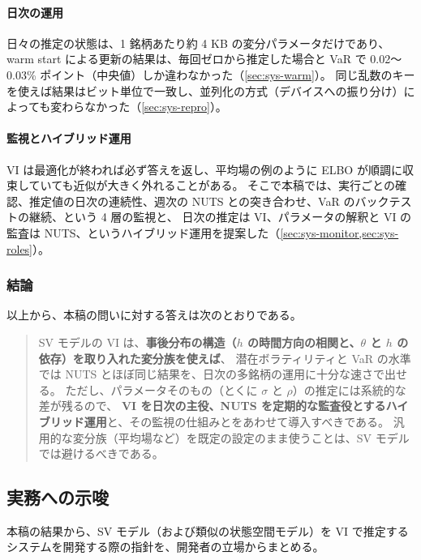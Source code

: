 \paragraph{日次の運用}
日々の推定の状態は、1 銘柄あたり約 4 KB の変分パラメータだけであり、warm start による更新の結果は、毎回ゼロから推定した場合と VaR で 0.02〜0.03\% ポイント（中央値）しか違わなかった（\cref{sec:sys-warm}）。
同じ乱数のキーを使えば結果はビット単位で一致し、並列化の方式（デバイスへの振り分け）によっても変わらなかった（\cref{sec:sys-repro}）。

\paragraph{監視とハイブリッド運用}
VI は最適化が終われば必ず答えを返し、平均場の例のように ELBO が順調に収束していても近似が大きく外れることがある。
そこで本稿では、実行ごとの確認、推定値の日次の連続性、週次の NUTS との突き合わせ、VaR のバックテストの継続、という 4 層の監視と、
日次の推定は VI、パラメータの解釈と VI の監査は NUTS、というハイブリッド運用を提案した（\cref{sec:sys-monitor,sec:sys-roles}）。

\subsubsection{結論}

以上から、本稿の問いに対する答えは次のとおりである。
\begin{quote}
  SV モデルの VI は、\textbf{事後分布の構造（$h$ の時間方向の相関と、$\theta$ と $h$ の依存）を取り入れた変分族を使えば}、
  潜在ボラティリティと VaR の水準では NUTS とほぼ同じ結果を、日次の多銘柄の運用に十分な速さで出せる。
  ただし、パラメータそのもの（とくに $\sigma$ と $\rho$）の推定には系統的な差が残るので、
  \textbf{VI を日次の主役、NUTS を定期的な監査役とするハイブリッド運用}と、その監視の仕組みとをあわせて導入すべきである。
  汎用的な変分族（平均場など）を既定の設定のまま使うことは、SV モデルでは避けるべきである。
\end{quote}

\subsection{実務への示唆}\label{sec:conc-implications}

本稿の結果から、SV モデル（および類似の状態空間モデル）を VI で推定するシステムを開発する際の指針を、開発者の立場からまとめる。

